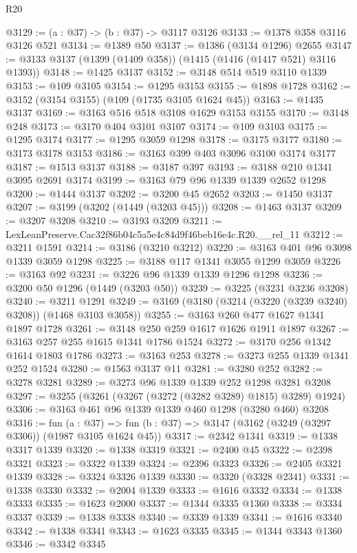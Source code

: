 \begin{lexlean}{R20}
\begin{coremodule}
@3129 := (a : @37) -> (b : @37) -> @3117 @3126
@3133 := @1378 @358 @3116 @3126 @521
@3134 := @1389 @50
@3137 := @1386 (@3134 @1296) @2655
@3147 := @3133 @3137 (@1399 (@1409 @358)) (@1415 (@1416 (@1417 @521) @3116 @1393))
@3148 := @1425 @3137
@3152 := @3148 @514 @519 @3110 @1339
@3153 := @109 @3105
@3154 := @1295 @3153
@3155 := @1898 @1728
@3162 := @3152 (@3154 @3155) (@109 (@1735 @3105 @1624 @45))
@3163 := @1435 @3137
@3169 := @3163 @516 @518 @3108 @1629 @3153 @3155
@3170 := @3148 @248
@3173 := @3170 @404 @3101 @3107
@3174 := @109 @3103
@3175 := @1295 @3174
@3177 := @1295 @3059 @1298
@3178 := @3175 @3177
@3180 := @3173 @3178 @3153
@3186 := @3163 @399 @403 @3096 @3100 @3174 @3177
@3187 := @1513 @3137
@3188 := @3187 @397
@3193 := @3188 @210 @1341 @3095 @2691 @3174
@3199 := @3163 @79 @96 @1339 @1339 @2652 @1298
@3200 := @1444 @3137
@3202 := @3200 @45 @2652
@3203 := @1450 @3137
@3207 := @3199 (@3202 (@1449 (@3203 @45)))
@3208 := @1463 @3137
@3209 := @3207 @3208
@3210 := @3193 @3209
@3211 := LexLeanPreserve.Cac32f86b04c5a5e4c84d9f46beb16e4c.R20.__rel_11
@3212 := @3211 @1591
@3214 := @3186 (@3210 @3212)
@3220 := @3163 @401 @96 @3098 @1339 @3059 @1298
@3225 := @3188 @117 @1341 @3055 @1299 @3059
@3226 := @3163 @92
@3231 := @3226 @96 @1339 @1339 @1296 @1298
@3236 := @3200 @50 @1296 (@1449 (@3203 @50))
@3239 := @3225 (@3231 @3236 @3208)
@3240 := @3211 @1291
@3249 := @3169 (@3180 (@3214 (@3220 (@3239 @3240) @3208)) (@1468 @3103 @3058))
@3255 := @3163 @260 @477 @1627 @1341 @1897 @1728
@3261 := @3148 @250 @259 @1617 @1626 @1911 @1897
@3267 := @3163 @257 @255 @1615 @1341 @1786 @1524
@3272 := @3170 @256 @1342 @1614 @1803 @1786
@3273 := @3163 @253
@3278 := @3273 @255 @1339 @1341 @252 @1524
@3280 := @1563 @3137 @11
@3281 := @3280 @252
@3282 := @3278 @3281
@3289 := @3273 @96 @1339 @1339 @252 @1298 @3281 @3208
@3297 := @3255 (@3261 (@3267 (@3272 (@3282 @3289) @1815) @3289) @1924)
@3306 := @3163 @461 @96 @1339 @1339 @460 @1298 (@3280 @460) @3208
@3316 := fun (a : @37) =>
  fun (b : @37) => @3147 (@3162 (@3249 (@3297 @3306)) (@1987 @3105 @1624 @45))
@3317 := @2342 @1341
@3319 := @1338 @3317 @1339
@3320 := @1338 @3319
@3321 := @2400 @45
@3322 := @2398 @3321
@3323 := @3322 @1339
@3324 := @2396 @3323
@3326 := @2405 @3321 @1339
@3328 := @3324 @3326 @1339
@3330 := @3320 (@3328 @2341)
@3331 := @1338 @3330
@3332 := @2004 @1339
@3333 := @1616 @3332
@3334 := @1338 @3333
@3335 := @1623 @2000
@3337 := @1344 @3335 @1360
@3338 := @3334 @3337
@3339 := @1338 @3338
@3340 := @3339 @1339
@3341 := @1616 @3340
@3342 := @1338 @3341
@3343 := @1623 @3335
@3345 := @1344 @3343 @1360
@3346 := @3342 @3345

\end{coremodule}
\end{lexlean}

